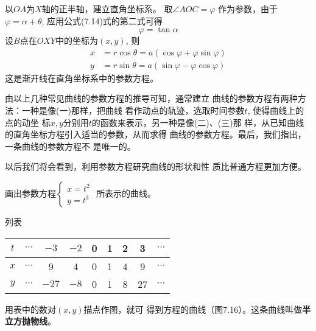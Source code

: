 以$OA$为$X$轴的正半轴，建立直角坐标系。
取$\angle AOC=\varphi$ 作为参数，由于
$\varphi =\alpha+\theta$, 
应用公式(7.14)式的第二式可得
$$\varphi  =\tan\alpha$$
设$B$点在$OXY$中的坐标为$(x,y)$, 则
\begin{equation}
\begin{split}
    x&=r\cos\theta=a(\cos\varphi+\varphi\sin\varphi)\\
    y&=r\sin\theta=a(\sin\varphi-\varphi\cos\varphi)
\end{split}
\end{equation}
这是渐开线在直角坐标系中的参数方程。

由以上几种常见曲线的参数方程的推导可知，通常建立
曲线的参数方程有两种方法：一种是像(一)那样，把曲线
看作动点的轨迹，选取时间参数$t$, 使得曲线上的点的动坐
标$x,y$分别用$t$的函数来表示，另一种是像(二)、(三)那
样，从已知曲线的直角坐标方程引入适当的参数，从而求得
曲线的参数方程。最后，我们指出，一条曲线的参数方程不
是唯一的。

以后我们将会看到，利用参数方程研究曲线的形状和性
质比普通方程更加方便。

\begin{example}
    画出参数方程$\begin{cases}
        x=t^2\\ y=t^3
    \end{cases}$
    所表示的曲线。
\end{example}


\begin{solution}
列表
\begin{center}
\begin{tabular}{ccccccccc}
\hline
$t$&$\cdots$ &$-3$ &$-2$&0&1&2&3&$\cdots$\\
\hline
$x$&$\cdots$ & 9&4&0&1&4&9             &$\cdots$ \\
$y$&$\cdots$ & $-27$&$-8$ &0&1&8&27  &$\cdots$ \\
\hline
\end{tabular}
\end{center}

用表中的数对$(x,y)$描点作图，就可
得到方程的曲线（图7.16）。这条曲线叫做\textbf{半立方抛物线}。

\begin{figure}[htp]
    \centering
{}
    \caption{}
\end{figure}

\end{solution}

